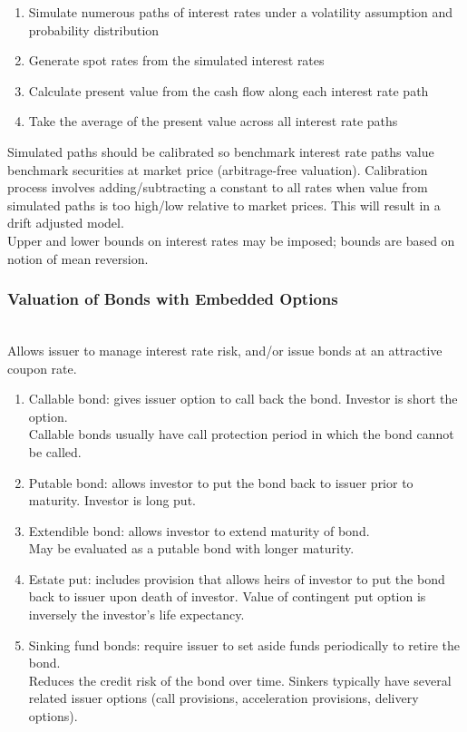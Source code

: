 \begin{method} 
\begin{enumerate}[label=\roman*.]
\setlength{\itemsep}{0pt}
\item Simulate numerous paths of interest rates under a volatility assumption and probability distribution
\item Generate spot rates from the simulated interest rates
\item Calculate present value from the cash flow along each interest rate path
\item Take the average of the present value across all interest rate paths
\end{enumerate}
Simulated paths should be calibrated so benchmark interest rate paths value benchmark securities at market price (arbitrage-free valuation). Calibration process involves adding/subtracting a constant to all rates when value from simulated paths is too high/low relative to market prices. This will result in a drift adjusted model.\\
Upper and lower bounds on interest rates may be imposed; bounds are based on notion of mean reversion.
\end{method}

\subsubsection{Valuation of Bonds with Embedded Options}

\begin{remark} \\
Allows issuer to manage interest rate risk, and/or issue bonds at an attractive coupon rate.
\end{remark}

\begin{remark} 
\begin{enumerate}[label=\roman*.]
\setlength{\itemsep}{0pt}
\item Callable bond: gives issuer option to call back the bond. Investor is short the option.\\
Callable bonds usually have call protection period in which the bond cannot be called.
\item Putable bond: allows investor to put the bond back to issuer prior to maturity. Investor is long put.
\item Extendible bond: allows investor to extend maturity of bond.\\
May be evaluated as a putable bond with longer maturity.
\item Estate put: includes provision that allows heirs of investor to put the bond back to issuer upon death of investor. Value of contingent put option is inversely the investor's life expectancy.
\item Sinking fund bonds: require issuer to set aside funds periodically to retire the bond.\\
Reduces the credit risk of the bond over time. Sinkers typically have several related issuer options (call provisions, acceleration provisions, delivery options).
\end{enumerate}
\end{remark}

